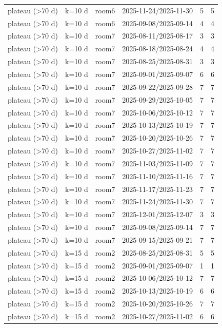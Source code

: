 \begin{tabular}{llllll}
plateau (>70 d) & k=10 d & room6 & 2025-11-24/2025-11-30 & 5 & 5 \\
plateau (>70 d) & k=10 d & room6 & 2025-09-08/2025-09-14 & 4 & 4 \\
plateau (>70 d) & k=10 d & room7 & 2025-08-11/2025-08-17 & 3 & 3 \\
plateau (>70 d) & k=10 d & room7 & 2025-08-18/2025-08-24 & 4 & 4 \\
plateau (>70 d) & k=10 d & room7 & 2025-08-25/2025-08-31 & 3 & 3 \\
plateau (>70 d) & k=10 d & room7 & 2025-09-01/2025-09-07 & 6 & 6 \\
plateau (>70 d) & k=10 d & room7 & 2025-09-22/2025-09-28 & 7 & 7 \\
plateau (>70 d) & k=10 d & room7 & 2025-09-29/2025-10-05 & 7 & 7 \\
plateau (>70 d) & k=10 d & room7 & 2025-10-06/2025-10-12 & 7 & 7 \\
plateau (>70 d) & k=10 d & room7 & 2025-10-13/2025-10-19 & 7 & 7 \\
plateau (>70 d) & k=10 d & room7 & 2025-10-20/2025-10-26 & 7 & 7 \\
plateau (>70 d) & k=10 d & room7 & 2025-10-27/2025-11-02 & 7 & 7 \\
plateau (>70 d) & k=10 d & room7 & 2025-11-03/2025-11-09 & 7 & 7 \\
plateau (>70 d) & k=10 d & room7 & 2025-11-10/2025-11-16 & 7 & 7 \\
plateau (>70 d) & k=10 d & room7 & 2025-11-17/2025-11-23 & 7 & 7 \\
plateau (>70 d) & k=10 d & room7 & 2025-11-24/2025-11-30 & 7 & 7 \\
plateau (>70 d) & k=10 d & room7 & 2025-12-01/2025-12-07 & 3 & 3 \\
plateau (>70 d) & k=10 d & room7 & 2025-09-08/2025-09-14 & 7 & 7 \\
plateau (>70 d) & k=10 d & room7 & 2025-09-15/2025-09-21 & 7 & 7 \\
plateau (>70 d) & k=15 d & room2 & 2025-08-25/2025-08-31 & 5 & 5 \\
plateau (>70 d) & k=15 d & room2 & 2025-09-01/2025-09-07 & 1 & 1 \\
plateau (>70 d) & k=15 d & room2 & 2025-10-06/2025-10-12 & 7 & 7 \\
plateau (>70 d) & k=15 d & room2 & 2025-10-13/2025-10-19 & 6 & 6 \\
plateau (>70 d) & k=15 d & room2 & 2025-10-20/2025-10-26 & 7 & 7 \\
plateau (>70 d) & k=15 d & room2 & 2025-10-27/2025-11-02 & 6 & 6 \\

\end{tabular}
